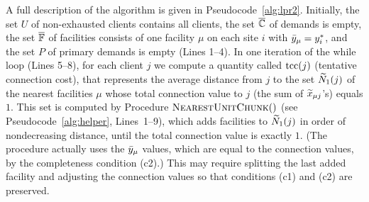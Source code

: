 \documentclass[oneside,final]{ucr}
\begin{document}
A full description of the algorithm is given in
Pseudocode~\ref{alg:lpr2}.  Initially, the set $U$ of
non-exhausted clients contains all clients, the set
$\overline{\mathbb{C}}$ of demands is empty, the set $\overline{\mathbb{F}}$ of
facilities consists of one facility $\mu$ on each site $i$
with ${\bar y}_\mu = y^\ast_i$, and the set $P$ of primary
demands is empty (Lines 1--4).  In one iteration of the
while loop (Lines 5--8), for each client $j$ we
compute a quantity called $\mbox{\rm{tcc}}(j)$ (tentative connection
cost), that represents the average distance from $j$ to the
set ${\widetilde N}_1(j)$ of the nearest facilities $\mu$ whose
total connection value to $j$ (the sum of ${\widetilde x}_{\mu
  j}$'s) equals $1$.  This set is computed by Procedure
${\textsc{NearestUnitChunk}}()$ (see Pseudocode~\ref{alg:helper},
Lines~1--9), which adds facilities to ${\widetilde N}_1(j)$ in
order of nondecreasing distance, until the total connection
value is exactly $1$. (The procedure actually uses the
${\bar y}_\mu$ values, which are equal to the connection values,
by the completeness condition (c2).)  This may require splitting the last added
facility and adjusting the connection values so that
conditions (c1) and (c2) are preserved.

\end{document}
